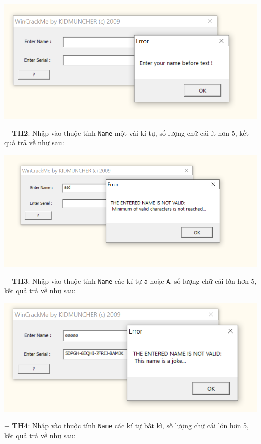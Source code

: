 \begin{center}
    \includegraphics[width=\textwidth]{img/file-2/demo3.PNG}
\end{center}
+ \textbf{TH2}: Nhập vào thuộc tính \texttt{Name} một vài kí tự, số lượng chữ cái ít hơn 5, kết quả trả về như sau:
\begin{center}
    \includegraphics[width=\textwidth]{img/file-2/demo4.PNG}
\end{center}
+ \textbf{TH3}: Nhập vào thuộc tính \texttt{Name} các kí tự \texttt{a} hoặc \texttt{A}, số lượng chữ cái lớn hơn 5, kết quả trả về như sau:
\begin{center}
    \includegraphics[width=\textwidth]{img/file-2/demo5.PNG}
\end{center}
+ \textbf{TH4}: Nhập vào thuộc tính \texttt{Name} các kí tự bất kì, số lượng chữ cái lớn hơn 5, kết quả trả về như sau:
